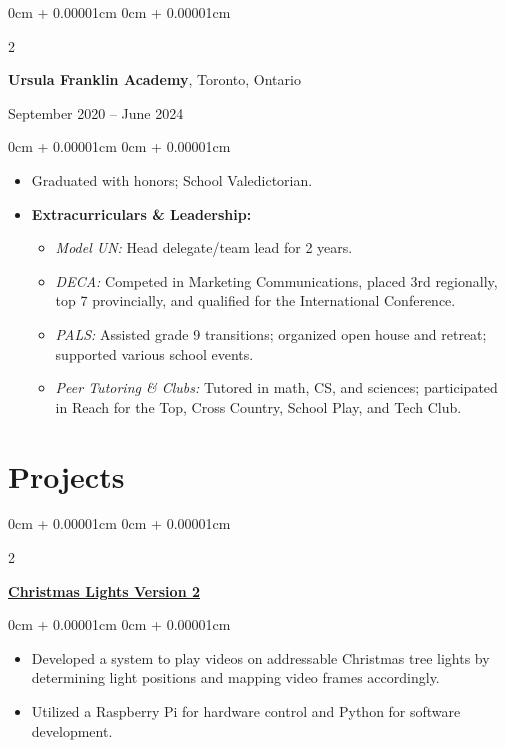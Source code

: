 \documentclass[10pt, letterpaper]{article}
\newenvironment{highlights}{
    \begin{itemize}[
        topsep=0.10cm,
        parsep=0.10cm,
        partopsep=0pt,
        itemsep=0pt,
        leftmargin=0cm + 10pt
    ]
}{
    \end{itemize}
}
\newenvironment{onecolentry}{
    \begin{adjustwidth}{
        0cm + 0.00001cm
    }{
        0cm + 0.00001cm
    }
}{
    \end{adjustwidth}
}
\newenvironment{twocolentry}[2][]{
    \onecolentry
    \def\secondColumn{#2}
    \setcolumnwidth{\fill, 5.5 cm} %
    \begin{paracol}{2}
}{
    \switchcolumn \raggedleft \secondColumn
    \end{paracol}
    \endonecolentry
}
\begin{document}
    \vspace{0.2cm}

    \begin{twocolentry}{September 2020 – June 2024}
    \textbf{Ursula Franklin Academy}, Toronto, Ontario
    \end{twocolentry}
    \vspace{0.10cm}
    \begin{onecolentry}
        \begin{highlights}
            \item Graduated with honors; School Valedictorian.
            \item \textbf{Extracurriculars \& Leadership:}
                \begin{itemize}[leftmargin=15pt]
                    \item \textit{Model UN:} Head delegate/team lead for 2 years.
                    \item \textit{DECA:} Competed in Marketing Communications, placed 3rd regionally, top 7 provincially, and qualified for the International Conference.
                    \item \textit{PALS:} Assisted grade 9 transitions; organized open house and retreat; supported various school events.
                    \item \textit{Peer Tutoring \& Clubs:} Tutored in math, CS, and sciences; participated in Reach for the Top, Cross Country, School Play, and Tech Club.
                \end{itemize}
        \end{highlights}
    \end{onecolentry}

    \section{Projects}
    \begin{twocolentry}{}
        \textbf{\href{https://blucardin.github.io/projects/christmas-lights-v2/}{Christmas Lights Version 2}}
    \end{twocolentry}
    \vspace{0.10cm}
    \begin{onecolentry}
        \begin{highlights}
            \item Developed a system to play videos on addressable Christmas tree lights by determining light positions and mapping video frames accordingly.
            \item Utilized a Raspberry Pi for hardware control and Python for software development.
        \end{highlights}
    \end{onecolentry}
\end{document}
